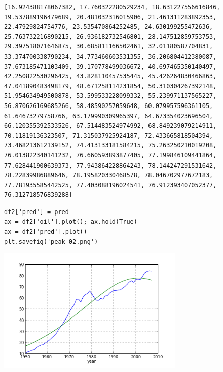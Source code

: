 \documentclass[12pt,fleqn]{article}\usepackage{../common}
\begin{document}
\begin{verbatim}
[16.924388178067382, 17.760322280529234, 18.631227556616846, 19.537889196479689, 20.481032316015906, 21.461311283892353, 22.47929824754776, 23.535470864252485, 24.630199255472636, 25.763732216890215, 26.936182732546801, 28.147512859753753, 29.397518071646875, 30.685811166502461, 32.01180587704831, 33.374700338790234, 34.773460603531355, 36.206804412380087, 37.673185471103409, 39.170778499036672, 40.697465350140497, 42.250822530296425, 43.828110457535445, 45.426264830466863, 47.041890483498179, 48.671258114231854, 50.310304267392148, 51.954634949500878, 53.599533228099332, 55.239971137565227, 56.870626169685266, 58.48590257059648, 60.079957596361105, 61.64673279758766, 63.179990309965397, 64.673354023696504, 66.120355392533526, 67.514483524974992, 68.849239079214911, 70.11819136323507, 71.315037925924187, 72.433665818504394, 73.468213612139152, 74.413133181584215, 75.263250210019208, 76.013822340141232, 76.660593893877405, 77.199846109441864, 77.628441900639373, 77.943864228864243, 78.144247291531642, 78.22839986889646, 78.195820330468578, 78.046702977672183, 77.781935585442525, 77.403088196024541, 76.912393407052377, 76.312718576839288]
\end{verbatim}

\begin{verbatim}
df2['pred'] = pred
ax = df2['oil'].plot(); ax.hold(True)
ax = df2['pred'].plot()
plt.savefig('peak_02.png')
\end{verbatim}

\includegraphics[height=6cm]{peak_02.png}
\end{document}
